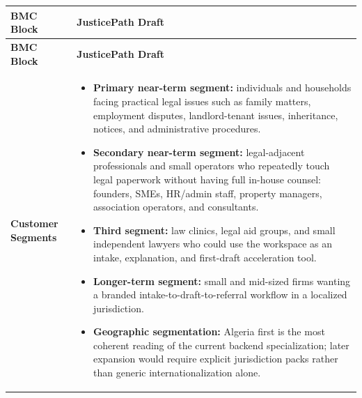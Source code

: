 \documentclass[11pt]{article}
\begin{document}
\begin{longtable}{p{} p{}}
\toprule
\textbf{BMC Block} & \textbf{JusticePath Draft} \\
\midrule
\endfirsthead
\toprule
\textbf{BMC Block} & \textbf{JusticePath Draft} \\
\midrule
\endhead

\textbf{Customer Segments} &
\begin{itemize}
  \item \textbf{Primary near-term segment:} individuals and households facing practical legal issues such as family matters, employment disputes, landlord-tenant issues, inheritance, notices, and administrative procedures.
  \item \textbf{Secondary near-term segment:} legal-adjacent professionals and small operators who repeatedly touch legal paperwork without having full in-house counsel: founders, SMEs, HR/admin staff, property managers, association operators, and consultants.
  \item \textbf{Third segment:} law clinics, legal aid groups, and small independent lawyers who could use the workspace as an intake, explanation, and first-draft acceleration tool.
  \item \textbf{Longer-term segment:} small and mid-sized firms wanting a branded intake-to-draft-to-referral workflow in a localized jurisdiction.
  \item \textbf{Geographic segmentation:} Algeria first is the most coherent reading of the current backend specialization; later expansion would require explicit jurisdiction packs rather than generic internationalization alone.
\end{itemize} \\


\end{longtable}
\end{document}
